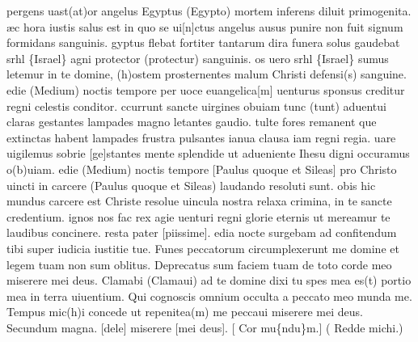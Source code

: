 \documentclass[letter,12pt]{book}
\begin{document}
pergens uast(at)or angelus
Egyptus (Egypto) mortem inferens
diluit primogenita.
\ae c hora iustis salus est
in quo se ui[n]ctus angelus
ausus punire non fuit
signum formidans sanguinis.
gyptus flebat fortiter
tantarum dira funera
solus gaudebat srhl \{Israel\}
agni protector (protectur) sanguinis.
os uero srhl \{Israel\} sumus
letemur in te domine,
(h)ostem prosternentes malum
Christi defensi(s) sanguine.
edie (Medium) noctis tempore
per uoce euangelica[m]
uenturus sponsus creditur
regni celestis conditor.
ccurrunt sancte uirgines
obuiam tunc (tunt) aduentui
claras gestantes lampades
magno letantes gaudio.
tulte fores remanent
que extinctas habent lampades
frustra pulsantes ianua
clausa iam regni regia.
uare uigilemus sobrie
[ge]stantes mente splendide
ut adueniente Ihesu
digni occuramus o(b)uiam.
edie (Medium) noctis tempore
[Paulus quoque et Sileas]
pro Christo uincti in carcere
(Paulus quoque et Sileas)
laudando resoluti sunt.
obis hic mundus carcere
est Christe resolue uincula
nostra relaxa crimina,
in te sancte credentium.
ignos nos fac
rex agie
uenturi regni glorie
eternis ut mereamur
te laudibus concinere.
resta pater [piissime].
edia nocte surgebam ad confitendum tibi super iudicia iustitie tue.
{\color{Red} F}unes peccatorum circumplexerunt me domine et legem tuam non sum oblitus.
{\color{Red} D}eprecatus sum faciem tuam de toto corde meo miserere mei deus.
{\color{Red} C}lamabi (Clamaui) ad te domine dixi tu spes mea es(t) portio mea in terra uiuentium.
{\color{Red} Q}ui cognoscis omnium occulta a peccato meo munda me.
{\color{Red} T}empus mic(h)i concede ut repenitea(m) me peccaui miserere mei deus.
{\color{Red} S}ecundum magna. [dele] miserere [mei deus].
[{\color{Red} C}or mu\{ndu\}m.]
({\color{Red} R}edde michi.)
\end{document}
